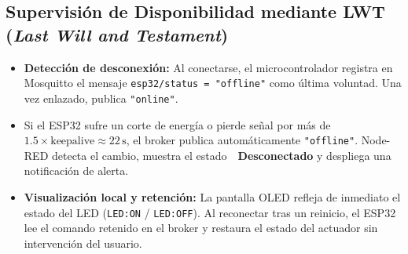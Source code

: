 \subsection{Supervisión de Disponibilidad mediante LWT (\textit{Last Will and Testament})}
\begin{itemize}[noitemsep]
    \item \practicaBadge \textbf{Detección de desconexión:} Al conectarse, el microcontrolador registra en Mosquitto el mensaje \texttt{esp32/status = "offline"} como última voluntad. Una vez enlazado, publica \texttt{"online"}.
    \item Si el ESP32 sufre un corte de energía o pierde señal por más de $1.5 \times \text{keepalive} \approx 22\,\text{s}$, el broker publica automáticamente \texttt{"offline"}. Node-RED detecta el cambio, muestra el estado \textbf{🔴 Desconectado} y despliega una notificación de alerta.
    \item \proyectoBadge \textbf{Visualización local y retención:} La pantalla OLED refleja de inmediato el estado del LED (\texttt{LED:ON} / \texttt{LED:OFF}). Al reconectar tras un reinicio, el ESP32 lee el comando retenido en el broker y restaura el estado del actuador sin intervención del usuario.
\end{itemize}
